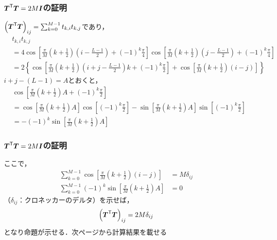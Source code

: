 \documentclass[14pt,xcolor=dvipsnames,table,dvipdfmx]{beamer}
\begin{document}
\begin{frame}[c]
    \frametitle{$\boldsymbol{T}^{\mathsf{T}} \boldsymbol{T} = 2M\boldsymbol{I}$の証明}
    $\left( \boldsymbol{T}^{\mathsf{T}} \boldsymbol{T} \right)_{ij} = \sum_{k = 0}^{M - 1} t_{k,i} t_{k,j}$であり，
    \scriptsize
    \begin{align*}
        & t_{k,i} t_{k,j} \\
        &= 4 \cos\left[ \frac{\pi}{M} \left( k + \frac{1}{2} \right) \left( i - \frac{L - 1}{2} \right) + (-1)^{k}\frac{\pi}{4} \right] \cos\left[ \frac{\pi}{M} \left( k + \frac{1}{2} \right) \left( j - \frac{L - 1}{2} \right) + (-1)^{k}\frac{\pi}{4} \right] \\
        &= 2 \left\{ \cos\left[ \frac{\pi}{M} \left( k + \frac{1}{2} \right) \left( i + j - \frac{L - 1}{2} \right) k + (-1)^{k} \frac{\pi}{2} \right] + \cos\left[ \frac{\pi}{M} \left( k + \frac{1}{2} \right) \left( i - j \right) \right] \right\}
    \end{align*}
    \normalsize
    $i + j - (L - 1) = A$とおくと，
    \scriptsize
    \begin{align*}
        & \cos\left[ \frac{\pi}{M} \left( k + \frac{1}{2} \right)A + (-1)^{k}\frac{\pi}{2} \right] \\
        &= \cos\left[ \frac{\pi}{M} \left( k + \frac{1}{2} \right)A \right] \cos\left[(-1)^{k}\frac{\pi}{2} \right] - \sin\left[ \frac{\pi}{M} \left( k + \frac{1}{2} \right)A \right] \sin\left[(-1)^{k}\frac{\pi}{2} \right] \\
        &= -(-1)^{k} \sin \left[ \frac{\pi}{M} \left( k + \frac{1}{2} \right)A \right]
    \end{align*}
\end{frame}

\begin{frame}[c]
    \frametitle{$\boldsymbol{T}^{\mathsf{T}} \boldsymbol{T} = 2M\boldsymbol{I}$の証明}
    ここで，
    \begin{align}
        \sum_{k = 0}^{M - 1}\cos\left[ \frac{\pi}{M} \left( k + \frac{1}{2} \right) \left( i - j \right) \right] &= M\delta_{ij} \label{eq:orthogonal_condition_cos} \\
        \sum_{k = 0}^{M - 1}(-1)^{k} \sin \left[ \frac{\pi}{M} \left( k + \frac{1}{2} \right)A \right] &= 0 \label{eq:orthogonal_condition_sin}
    \end{align}
    （$\delta_{ij}$：クロネッカーのデルタ）を示せば，
    \begin{align*}
        \left( \boldsymbol{T}^{\mathsf{T}} \boldsymbol{T} \right)_{ij} = 2M \delta_{ij}
    \end{align*}
    となり命題が示せる．次ページから計算結果を載せる
\end{frame}
\end{document}
